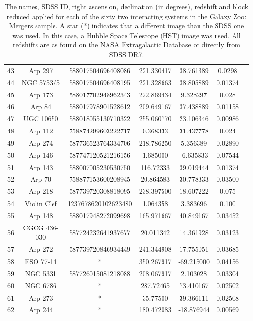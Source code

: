 \begin{table}
\begin{tabular}{|c|c|c|c|c|c|c|}
         43 & Arp 297 & 588017604696408086 & 221.330417 & 38.761389 & 0.0298 \\
         44 & NGC 5753/5 & 588017604696408195 & 221.328663 & 38.805889 & 0.01374 \\
         45 & Arp 173 & 588017702948962343 & 222.869434 & 9.328297 & 0.028 \\
         46 & Arp 84 & 588017978901528612 & 209.649167 & 37.438889 & 0.01158 \\
         47 & UGC 10650 & 588018055130710322 & 255.060770 & 23.106346 & 0.00986 \\
         48 & Arp 112 & 758874299603222717 & 0.368333 & 31.437778 & 0.024 \\
         49 & Arp 274 & 587736523764334706 & 218.786250 & 5.356389 & 0.02890 \\
         50 & Arp 146 & 587747120521216156 & 1.685000 & -6.635833 & 0.07544 \\
         51 & Arp 143 & 588007005230530750 & 116.72333 & 39.019444 & 0.01374 \\
         52 & Arp 70 & 758877153600208945 & 20.864583 & 30.778333 & 0.03500 \\
         53 & Arp 218 & 587739720308818095 & 238.397500 & 18.607222 & 0.075 \\
         54 & Violin Clef & 1237678620102623480 & 1.064358 & 3.383696 & 0.100 \\
         55 & Arp 148 & 588017948272099698 & 165.971667 & 40.849167 & 0.03452 \\
         56 & CGCG 436-030 & 587724232641937677 & 20.011342 & 14.361928 & 0.03123 \\
         57 & Arp 272 & 587739720846934449 & 241.344908 & 17.755051 & 0.03685 \\
         58 & ESO 77-14 & * & 350.267917 & -69.215000 & 0.04156 \\
         59 & NGC 5331 & 587726015081218088 & 208.067917 & 2.103028 & 0.03304 \\
         60 & NGC 6786 & * & 287.72465 & 73.410167 & 0.02502 \\
         61 & Arp 273 & * & 35.77500 & 39.366111 & 0.02508 \\
         62 & Arp 244 & * & 180.472083 & -18.876944 & 0.00569 \\
         \hline
    \end{tabular}
    \caption{The names, SDSS ID, right ascension, declination (in degrees), redshift and block reduced applied for each of the sixty two interacting systems in the Galaxy Zoo: Mergers sample. A star (*) indicates that a different image than the SDSS one was used. In this case, a Hubble Space Telescope (HST) image was used. All redshifts are as found on the NASA Extragalactic Database or directly from SDSS DR7.}
    \label{tab:Objects}
\end{table}

